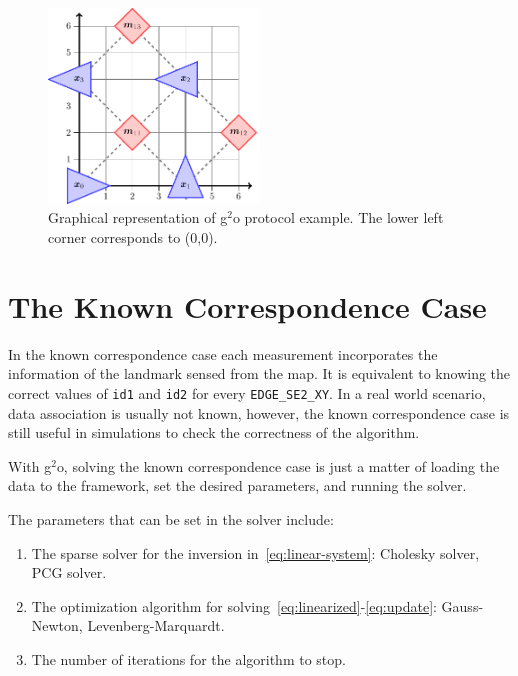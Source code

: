 \begin{figure}[htbp!]
    \centering
    \includegraphics[width=0.5\textwidth]{tikz/protocol-example.pdf}
    \caption[Graphical representation of g$^2$o protocol example.]{Graphical representation of g$^2$o protocol example. The lower left corner corresponds to (0,0).}
    \label{fig:protocol-example}
\end{figure}

\section{The Known Correspondence Case}
\label{sec:known-asso-imp}

In the known correspondence case each measurement incorporates the information of the landmark sensed from the map. It is equivalent to knowing the correct values of \texttt{id1} and \texttt{id2} for every \texttt{EDGE\_SE2\_XY}. In a real world scenario, data association is usually not known, however, the known correspondence case is still useful in simulations to check the correctness of the algorithm.

With g$^2$o, solving the known correspondence case is just a matter of loading the data to the framework, set the desired parameters, and running the solver. 

The parameters that can be set in the solver include: 

\begin{enumerate}
    \item The sparse solver for the inversion in~\eqref{eq:linear-system}: Cholesky solver, PCG solver.
    \item The optimization algorithm for solving~\eqref{eq:linearized}-\eqref{eq:update}: Gauss-Newton, Levenberg-Marquardt.
    \item The number of iterations for the algorithm to stop.
\end{enumerate}

